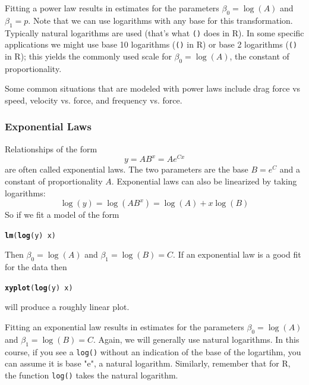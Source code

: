 \documentclass[twoside]{book}\usepackage[]{graphicx}\usepackage[]{xcolor}
\makeatletter
\newcommand{\hlopt}[1]{\textcolor[rgb]{0,0,0}{#1}}%
\newcommand{\hlstd}[1]{\textcolor[rgb]{0.345,0.345,0.345}{#1}}%
\newcommand{\hlkwd}[1]{\textcolor[rgb]{0.737,0.353,0.396}{\textbf{#1}}}%
\newenvironment{kframe}{%
 \def\at@end@of@kframe{}%
 \ifinner\ifhmode%
  \def\at@end@of@kframe{\end{minipage}}%
  \begin{minipage}{\columnwidth}%
 \fi\fi%
 \def\FrameCommand##1{\hskip\@totalleftmargin \hskip-\fboxsep
 \colorbox{shadecolor}{##1}\hskip-\fboxsep
     \hskip-\linewidth \hskip-\@totalleftmargin \hskip\columnwidth}%
 \MakeFramed {\advance\hsize-\width
   \@totalleftmargin\z@ \linewidth\hsize
   \@setminipage}}%
 {\par\unskip\endMakeFramed%
 \at@end@of@kframe}
\newenvironment{knitrout}{}{} %
\newcommand{\Rindex}[1]{\index{\texttt{#1}}}
\newcommand{\function}[1]{{\color{purple!75!blue}\texttt{\StrSubstitute{#1}{()}{}()}}\Rindex{#1}}
\def\R{{\sf R}}
\makeatother
\begin{document}
Fitting a power law results in estimates for the parameters $\beta_0 = \log(A)$ and $\beta_1 = p$.
Note that we can use logarithms with any base for this transformation.  Typically natural logarithms are used
(that's what \function{log()} does in \R).  
In some specific applications we might use base 10 logarithms (\function{log10()} in \R) 
or base 2 logarithms (\function{log2()} in \R); 
this yields the commonly used scale for 
$\beta_0 = \log(A)$, the constant of proportionality.

Some common situations that are modeled with power laws include drag force vs speed, velocity vs. force, and
frequency vs. force.

\subsubsection{Exponential Laws}

Relationships of the form 
\[ y = A B^x = A e^{Cx} \]
are often called exponential laws.  
The two parameters are the base $B = e^C$ and a constant of proportionality $A$.
Exponential laws can also be linearized by taking logarithms:
\[ \log(y) = \log(A B^x) = \log(A) + x \log(B) \]
So if we fit a model of the form
\begin{knitrout}
\color{fgcolor}\begin{kframe}
\begin{alltt}
\hlkwd{lm}\hlstd{(} \hlkwd{log}\hlstd{(y)} \hlopt{~} \hlstd{x )}
\end{alltt}
\end{kframe}
\end{knitrout}
Then $\beta_0 = \log(A)$ and $\beta_1 = \log(B) = C$.  
If an exponential law is a good fit for the data then
\begin{knitrout}
\color{fgcolor}\begin{kframe}
\begin{alltt}
\hlkwd{xyplot}\hlstd{(} \hlkwd{log}\hlstd{(y)} \hlopt{~} \hlstd{x )}
\end{alltt}
\end{kframe}
\end{knitrout}
will produce a roughly linear plot.

Fitting an exponential law results in estimates for the parameters $\beta_0 = \log(A)$ and $\beta_1 = \log(B) = C$.
Again, we will generally use natural logarithms. In this course, if you see a \texttt{log()} without an indication of the base of the logartihm, you can assume it is base "e", a natural logarithm.  Similarly, remember that for R, the function \texttt{log()} takes the natural logarithm.
\end{document}
